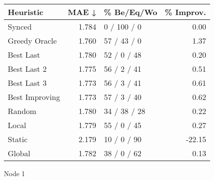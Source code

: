 \begin{tabular}{lrlr}
\toprule
\textbf{Heuristic} & \textbf{MAE ↓} & \textbf{\% Be/Eq/Wo} & \textbf{\% Improv.} \\
\midrule
            Synced &          1.784 &          0 / 100 / 0 &                0.00 \\
     Greedy Oracle &          1.760 &          57 / 43 / 0 &                1.37 \\
         Best Last &          1.780 &          52 / 0 / 48 &                0.20 \\
       Best Last 2 &          1.775 &          56 / 2 / 41 &                0.51 \\
       Best Last 3 &          1.773 &          56 / 3 / 41 &                0.61 \\
    Best Improving &          1.773 &          57 / 3 / 40 &                0.62 \\
            Random &          1.780 &         34 / 38 / 28 &                0.22 \\
             Local &          1.779 &          55 / 0 / 45 &                0.27 \\
            Static &          2.179 &          10 / 0 / 90 &              -22.15 \\
            Global &          1.782 &          38 / 0 / 62 &                0.13 \\
\bottomrule
\end{tabular}
\caption{Node 1}
\label{tab:ds_iid_lr01_le2_bs4_1}
